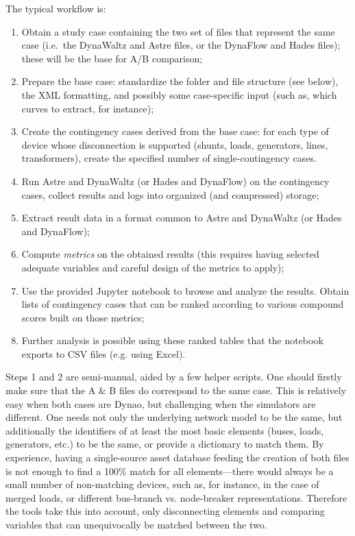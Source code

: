 \documentclass[conference]{IEEEtran}
\newcommand{\Dynawo}{Dyna\textomega o} %
\begin{document}
The typical workflow is:
\begin{enumerate}
  \item Obtain a study case containing the two set of files that represent the
        same case (i.e.~the DynaWaltz and Astre files, or the DynaFlow and Hades
        files); these will be the base for A/B comparison;
  \item Prepare the base case: standardize the folder and file structure (see
        below), the XML formatting, and possibly some case-specific input (such as,
        which curves to extract, for instance);
  \item Create the contingency cases derived from the base case: for each type
        of device whose disconnection is supported (shunts, loads, generators,
        lines, transformers), create the specified number of single-contingency
        cases.
  \item Run Astre and DynaWaltz (or Hades and DynaFlow) on the contingency
        cases, collect results and logs into organized (and compressed)
        storage;
  \item Extract result data in a format common to Astre and DynaWaltz (or Hades
        and DynaFlow);
  \item Compute \emph{metrics} on the obtained results (this requires having
        selected adequate variables and careful design of the metrics to apply);
  \item Use the provided Jupyter notebook to browse and analyze the results.
        Obtain lists of contingency cases that can be ranked according to various
        compound scores built on those metrics;
  \item Further analysis is possible using these ranked tables that
        the notebook exports to CSV files (e.g. using Excel).
\end{enumerate}

Steps 1 and 2 are semi-manual, aided by a few helper scripts.  One should
firstly make sure that the A \& B files do correspond to the same case. This is
relatively easy when both cases are \Dynawo, but challenging when the simulators
are different.  One needs not only the underlying network model to be the same,
but additionally the identifiers of at least the most basic elements (buses,
loads, generators, etc.) to be the same, or provide a dictionary to match them.
By experience, having a single-source asset database feeding the
creation of both files is not enough to find a 100\% match for all
elements---there would always be a small number of non-matching devices, such
as, for instance, in the case of merged loads, or different bus-branch
vs. node-breaker representations. Therefore the tools take this into account,
only disconnecting elements and comparing variables that can unequivocally be
matched between the two.
\end{document}
